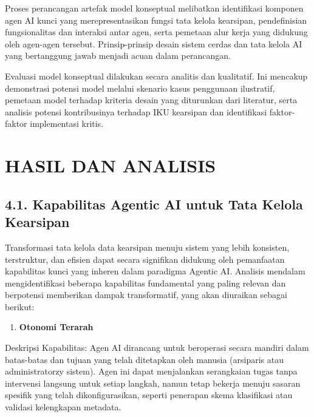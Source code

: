 Proses perancangan artefak model konseptual melibatkan identifikasi
komponen agen AI kunci yang merepresentasikan fungsi tata kelola
kearsipan, pendefinisian fungsionalitas dan interaksi antar agen, serta
pemetaan alur kerja yang didukung oleh agen-agen tersebut.
Prinsip-prinsip desain sistem cerdas dan tata kelola AI yang bertanggung
jawab menjadi acuan dalam perancangan.

Evaluasi model konseptual dilakukan secara analitis dan kualitatif. Ini
mencakup demonstrasi potensi model melalui skenario kasus penggunaan
ilustratif, pemetaan model terhadap kriteria desain yang diturunkan dari
literatur, serta analisis potensi kontribusinya terhadap IKU kearsipan
dan identifikasi faktor-faktor implementasi kritis.

\hypertarget{hasil-dan-analisis}{%
\section{HASIL DAN ANALISIS}\label{hasil-dan-analisis}}

\hypertarget{kapabilitas-agentic-ai-untuk-tata-kelola-kearsipan}{%
\subsection{4.1. Kapabilitas Agentic AI untuk Tata Kelola
Kearsipan}\label{kapabilitas-agentic-ai-untuk-tata-kelola-kearsipan}}

Transformasi tata kelola data kearsipan menuju sistem yang lebih
konsisten, terstruktur, dan efisien dapat secara signifikan didukung
oleh pemanfaatan kapabilitas kunci yang inheren dalam paradigma Agentic
AI. Analisis mendalam mengidentifikasi beberapa kapabilitas fundamental
yang paling relevan dan berpotensi memberikan dampak transformatif, yang
akan diuraikan sebagai berikut:

\begin{enumerate}
\def\labelenumi{\arabic{enumi}.}
\item
  \textbf{Otonomi Terarah}
\end{enumerate}

Deskripsi Kapabilitas: Agen AI dirancang untuk beroperasi secara mandiri
dalam batas-batas dan tujuan yang telah ditetapkan oleh manusia
(arsiparis atau administratorzy sistem). Agen ini dapat menjalankan
serangkaian tugas tanpa intervensi langsung untuk setiap langkah, namun
tetap bekerja menuju sasaran spesifik yang telah dikonfigurasikan,
seperti penerapan skema klasifikasi atau validasi kelengkapan metadata.

